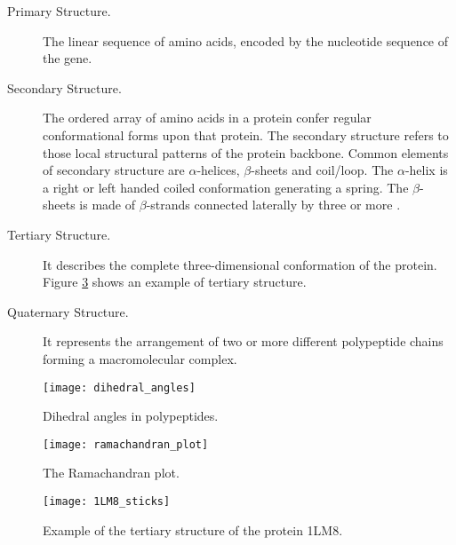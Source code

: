 \begin{description}
\item[Primary Structure.] The linear sequence of amino acids, encoded by the nucleotide sequence of the gene. 
\item[Secondary Structure.] The ordered array of amino acids in a protein confer regular conformational forms upon that protein. The secondary structure refers to those local structural patterns of the protein backbone.  Common elements of secondary structure are $\alpha$-helices, $\beta$-sheets and coil/loop. The $\alpha$-helix is a right or left handed coiled conformation generating a spring. The $\beta$-sheets is made of $\beta$-strands connected laterally by three or more .
\item[Tertiary Structure.] It describes the complete three-\-di\-men\-sio\-nal conformation of the protein. Figure \ref{fig:tertiary_structure_1LM8_sticks} shows an example of tertiary structure.
\item[Quaternary Structure.] It represents the arrangement of two or more different polypeptide chains forming a macromolecular complex.
\end{description}

\begin{figure}[tb]
	\begin{center}
		\texttt{[image: dihedral\_angles]}
		\caption[Dihedral angles in polypeptides]{Dihedral angles in polypeptides.}		
		\label{fig:dihedral_angles}
	\end{center}
\end{figure}
\begin{figure}[tb]
	\begin{center}
		\texttt{[image: ramachandran\_plot]}
		\caption[The Ramachandran plot]{The Ramachandran plot.}
		\label{fig:ramachandran_plot}
	\end{center}
\end{figure}
 \begin{figure}[tb]
	\begin{center}
		\texttt{[image: 1LM8\_sticks]}
		\caption[Tertiary structure of the protein 1LM8]{Example of the tertiary structure of the protein 1LM8.}
		\label{fig:tertiary_structure_1LM8_sticks}
	\end{center}
\end{figure}


